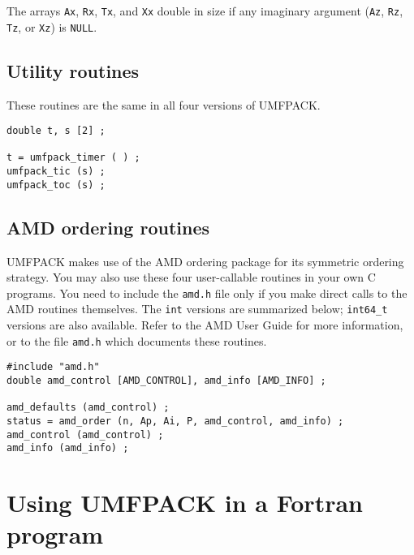 \documentclass[11pt]{article}
\begin{document}
The arrays {\tt Ax}, {\tt Rx}, {\tt Tx}, and {\tt Xx} double in size if
any imaginary argument ({\tt Az}, {\tt Rz}, {\tt Tz}, or {\tt Xz}) is {\tt NULL}.




\subsection{Utility routines}

These routines are the same in all four versions of UMFPACK.

{\footnotesize
\begin{verbatim}
double t, s [2] ;

t = umfpack_timer ( ) ;
umfpack_tic (s) ;
umfpack_toc (s) ;

\end{verbatim}
}

\subsection{AMD ordering routines}

UMFPACK makes use of the AMD ordering package for its symmetric ordering
strategy.  You may also use these four user-callable routines in your own C
programs.  You need to include the {\tt amd.h} file only if you make direct
calls to the AMD routines themselves.  The {\tt int} versions are summarized
below; \verb'int64_t' versions are also available.  Refer to the AMD User Guide
for more information, or to the file {\tt amd.h} which documents these routines.

{\footnotesize
\begin{verbatim}
#include "amd.h"
double amd_control [AMD_CONTROL], amd_info [AMD_INFO] ;

amd_defaults (amd_control) ;
status = amd_order (n, Ap, Ai, P, amd_control, amd_info) ;
amd_control (amd_control) ;
amd_info (amd_info) ;

\end{verbatim}
}

\section{Using UMFPACK in a Fortran program}
\end{document}
